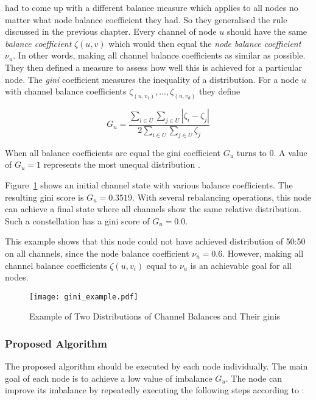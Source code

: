 \documentclass[final]{fhnwreport}       %
\begin{document}
\citeauthor{pickhardt_imbalance_2019} had to come up with a different balance measure which applies to all nodes no matter what node balance coefficient they had. So they generalised the rule discussed in the previous chapter. Every channel of node $u$ should have the same \emph{balance coefficient} $\zeta{(u,v)}$ which would then equal the \emph{node balance coefficient} $\nu_u$. In other words, making all channel balance coefficients as similar as possible. They then defined a measure to assess how well this is achieved for a particular node. The \emph{\gls{gini}} coefficient measures the inequality of a distribution. For a node $u$ with channel balance coefficients $\zeta_{(u,v_1)},\dots,\zeta_{(u,v_d)}$ they define

$$G_u = \frac{\displaystyle{\sum_{i\in U} \sum_{j \in U}} | \zeta_i - \zeta_j |}{2 \displaystyle{\sum_{i \in U} \sum_{j \in U} \zeta_j}}$$

When all balance coefficients are equal the \gls{gini} coefficient $G_u$ turns to $0$. A value of $G_u=1$ represents the most unequal distribution \citep{pickhardt_imbalance_2019}.

Figure~\ref{fig:gini_example} shows an initial channel state with various balance coefficients. The resulting \gls{gini} score is $G_u=0.3519$. With several rebalancing operations, this node can achieve a final state where all channels show the same relative distribution. Such a constellation has a \gls{gini} score of $G_u=0.0$. 

This example shows that this node could not have achieved distribution of 50:50 on all channels, since the node balance coefficient $\nu_u = 0.6$. However, making all channel balance coefficients $\zeta{(u,v_i)}$ equal to $\nu_u$ is an achievable goal for all nodes. 

\begin{figure}[H]
\centering
\texttt{[image: gini\_example.pdf]}
\caption{Example of Two Distributions of Channel Balances and Their \gls{gini}s}
\label{fig:gini_example}
\end{figure}


\subsubsection{Proposed Algorithm}\label{subsec:prop_algo}
The proposed algorithm should be executed by each node individually. The main goal of each node is to achieve a low value of imbalance $G_u$. The node can improve its imbalance by repeatedly executing the following steps according to \cite{pickhardt_imbalance_2019}:
\end{document}

